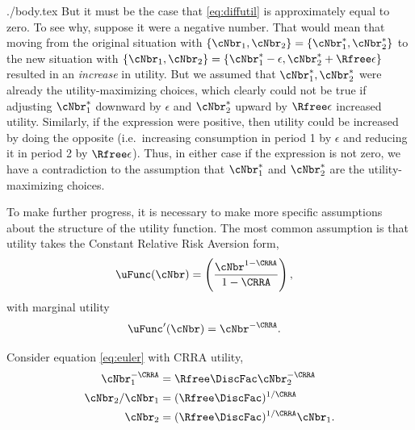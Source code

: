 \documentclass{handout}
\begin{document}
\begin{verbatimwrite}{./body.tex}
  But it must be the case that \eqref{eq:diffutil} is approximately equal to zero.  To
  see why, suppose it were a negative number.  That would mean that
  moving from the original situation with $\{\cNbr_{1},\cNbr_{2}\} =
  \{\cNbr_{1}^{*},\cNbr_{2}^{*}\}$ to the new situation with $\{\cNbr_{1},\cNbr_{2}\}
  = \{\cNbr_{1}^{*}-\epsilon,\cNbr_{2}^{*}+\Rfree\epsilon\}$ resulted in an {\it
    increase} in utility.  But we assumed that $\cNbr_{1}^{*},\cNbr_{2}^{*}$ were
  already the utility-maximizing choices, which clearly could not be
  true if adjusting $\cNbr_{1}^{*}$ downward by $\epsilon$ and $\cNbr^{*}_{2}$
  upward by $\Rfree \epsilon$ increased utility.  Similarly, if the
  expression were positive, then utility could be increased by doing the
  opposite (i.e.\ increasing consumption in period 1 by $\epsilon$ and
  reducing it in period 2 by $\Rfree\epsilon$).  Thus, in either case if the
  expression is not zero, we have a contradiction to the assumption that
  $\cNbr_{1}^{*}$ and $\cNbr_{2}^{*}$ are the utility-maximizing choices.

  To make further progress, it is necessary to make
  more specific assumptions about the structure of the utility function.
  The most common assumption is that utility takes the Constant Relative
  Risk Aversion form,
  \begin{equation}\begin{gathered}\begin{aligned}
        \uFunc(\cNbr) & =  \left(\frac{\cNbr^{1-\CRRA}}{1-\CRRA}\right) \label{eq:crrautil},
      \end{aligned}\end{gathered}\end{equation}
  with marginal utility
  \begin{equation}\begin{gathered}\begin{aligned}
        \uFunc^{\prime}(\cNbr) & =  \cNbr^{-\CRRA} \label{eq:crramargutil}.
      \end{aligned}\end{gathered}\end{equation}

  Consider equation \eqref{eq:euler} with CRRA utility,
  \begin{equation}\begin{gathered}\begin{aligned}
        \cNbr_{1}^{-\CRRA} & =  \Rfree\DiscFac \cNbr_{2}^{-\CRRA}  \\
        \cNbr_{2}/\cNbr_{1} & =  (\Rfree\DiscFac)^{1/\CRRA}   \\
        \cNbr_{2} & =  (\Rfree\DiscFac)^{1/\CRRA}\cNbr_{1} \label{eq:c1euler}.
      \end{aligned}\end{gathered}\end{equation}


\end{verbatimwrite}
\end{document}
